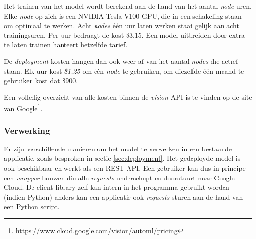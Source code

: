 Het trainen van het model wordt berekend aan de hand van het aantal \textit{node} uren. Elke \textit{node} op zich is een NVIDIA Tesla V100 GPU, die in een schakeling staan om optimaal te werken. Acht \textit{nodes} één uur laten werken staat gelijk aan acht trainingsuren. Per uur bedraagt de kost \$3.15. Een model uitbreiden door extra te laten trainen hanteert hetzelfde tarief.

De \textit{deployment} kosten hangen dan ook weer af van het aantal \textit{nodes} die actief staan. Elk uur kost \textit{\$1.25} om één \textit{node} te gebruiken, om diezelfde één maand te gebruiken kost dat \$900.

Een volledig overzicht van alle kosten binnen de \textit{vision} API is te vinden op de site van Google\footnote{\url{https://www.cloud.google.com/vision/automl/pricing}}.

\subsubsection{Verwerking}
\label{sucsubsec:google-nfr-verwerking}

Er zijn verschillende manieren om het model te verwerken in een bestaande applicatie, zoals besproken in sectie \ref{sec:deployment}. Het gedeployde model is ook beschikbaar en werkt als een REST API. Een gebruiker kan dus in principe een \textit{wrapper} bouwen die alle \textit{requests} onderschept en doorstuurt naar Google Cloud. De client library zelf kan intern in het programma gebruikt worden (indien Python) anders kan een applicatie ook \textit{requests} sturen aan de hand van een Python script. 